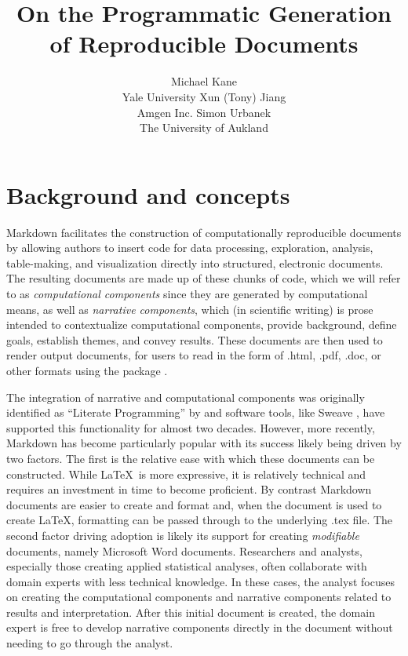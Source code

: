 \documentclass[
]{jss}
\author{
Michael Kane\\Yale University \And Xun (Tony) Jiang\\Amgen
Inc. \And Simon Urbanek\\The University of Aukland
}
\title{On the Programmatic Generation of Reproducible Documents}
\begin{document}
\hypertarget{background-and-concepts}{%
\section{Background and concepts}\label{background-and-concepts}}

 Markdown \citep[\citet{rmarkdownbook}]{baumer2014}
facilitates the construction of computationally reproducible documents
by allowing authors to insert  code for data processing,
exploration, analysis, table-making, and visualization directly into
structured, electronic documents. The resulting documents are made up of
these chunks of  code, which we will refer to as
\emph{computational components} since they are generated by
computational means, as well as \emph{narrative components}, which (in
scientific writing) is prose intended to contextualize computational
components, provide background, define goals, establish themes, and
convey results. These documents are then used to render output
documents, for users to read in the form of .html, .pdf, .doc, or other
formats using the  package \citep{knitrbook}.

The integration of narrative and computational components was originally
identified as ``Literate Programming'' by \citet{knuth1984} and software
tools, like Sweave \citep{leisch2002}, have supported this functionality
for almost two decades. However, more recently,  Markdown
has become particularly popular with its success likely being driven by
two factors. The first is the relative ease with which these documents
can be constructed. While \LaTeX ~is more expressive, it is relatively
technical and requires an investment in time to become proficient. By
contrast  Markdown documents are easier to create and format
and, when the document is used to create \LaTeX, formatting can be
passed through to the underlying .tex file. The second factor driving
adoption is likely its support for creating \emph{modifiable} documents,
namely Microsoft Word documents. Researchers and analysts, especially
those creating applied statistical analyses, often collaborate with
domain experts with less technical knowledge. In these cases, the
analyst focuses on creating the computational components and narrative
components related to results and interpretation. After this initial
document is created, the domain expert is free to develop narrative
components directly in the document without needing to go through the
analyst.
\end{document}
